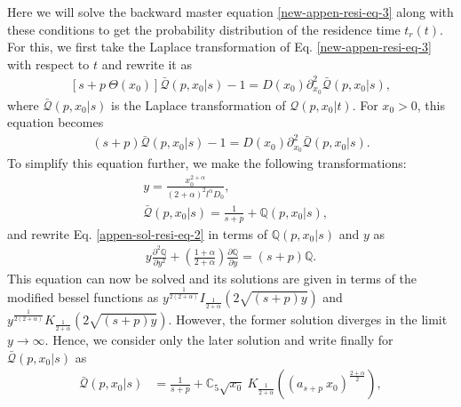 \documentclass[superscriptaddress,amsmath,amssymb,aps,onecolumn]{revtex4}
\begin{document}
Here we will solve the backward master equation \eqref{new-appen-resi-eq-3} along with these conditions to get the probability distribution of the residence time $t_r(t)$. For this, we first take the Laplace transformation of Eq. \eqref{new-appen-resi-eq-3} with respect to $t$ and rewrite it as
\begin{align}
\left[ s+p ~\Theta (x_0) \right] \bar{\mathcal{Q}}(p,x_0|s) - 1= D(x_0) \partial _{x_0}^2\bar{\mathcal{Q}}(p,x_0|s),
\label{appen-sol-resi-eq-1}
\end{align}
where $\bar{\mathcal{Q}}(p,x_0|s)$ is the Laplace transformation of $\mathcal{Q}(p,x_0|t)$. For $x_0>0$, this equation becomes
\begin{align}
 (s+p) \bar{\mathcal{Q}}(p,x_0|s) - 1= D(x_0) \partial _{x_0}^2\bar{\mathcal{Q}}(p,x_0|s). 
\label{appen-sol-resi-eq-2}
\end{align}
To simplify this equation further, we make the following transformations: 
\begin{align}
&y = \frac{x_0 ^{2+\alpha}}{(2+\alpha)^2 l^{\alpha} D_0}, \\
&\bar{\mathcal{Q}}(p,x_0|s) = \frac{1}{s+p}+\mathbb{Q}(p,x_0|s),
\end{align}
and rewrite Eq. \eqref{appen-sol-resi-eq-2} in terms of $\mathbb{Q}(p,x_0|s)$ and $y$ as
\begin{align}
y \frac{\partial ^2 \mathbb{Q}}{\partial y^2} + \left(\frac{1+\alpha}{2+\alpha} \right) \frac{\partial  \mathbb{Q}}{\partial y} = (s+p) \mathbb{Q}.
\label{appen-sol-resi-eq-4}
\end{align}
This equation can now be solved and its solutions are given in terms of the modified bessel functions as $y^{\frac{1}{2(2+\alpha)}} I_{\frac{1}{2+\alpha}} \left( 2 \sqrt{(s+p) y}\right)$ and $y^{\frac{1}{2(2+\alpha)}} K_{\frac{1}{2+\alpha}} \left( 2 \sqrt{(s+p) y}\right)$. However, the former solution diverges in the limit $y \to \infty$. Hence, we consider only the later solution and write finally for $\bar{\mathcal{Q}}(p,x_0|s)$ as
\begin{align}
\bar{\mathcal{Q}}(p,x_0|s) & = \frac{1}{s+p} +\mathbb{C}_5 \sqrt{x_0}~K_{\frac{1}{2+\alpha}} \left( (a_{s+p}~ x_0)^{\frac{2+\alpha}{2}}\right),
\label{appen-sol-resi-eq-5}
\end{align}
\end{document}
